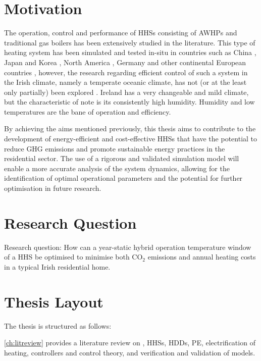 \section{Motivation}
The operation, control and performance of \acp{HHS} consisting of \acp{AWHP} and traditional gas boilers has been extensively studied in the literature. This type of heating system has been simulated and tested in-situ in countries such as China \cite{li_parallel_2018}, Japan and Korea \cite{jang_continuous_2013, park_performance_2014}, North America \cite{rauschkolb_cost-optimal_2020, }, Germany \cite{klein_numerical_2014} and other continental European countries \cite{bagarella_annual_2016, roccatello_analysis_2022, amirkhizi_cost_2020, dongellini_influence_2021,di_perna_experimental_2015}, however, the research regarding efficient control of such a system in the Irish climate, namely a temperate oceanic climate, has not (or at the least only partially) been explored \cite{heinen_electricity_2016}. Ireland has a very changeable and mild climate, but the characteristic of note is its consistently high humidity. Humidity and low temperatures are the bane of \HP operation and efficiency.

By achieving the aims mentioned previously, this thesis aims to contribute to the development of energy-efficient and cost-effective \acp{HHS} that have the potential to reduce \ac{GHG} emissions and promote sustainable energy practices in the residential sector. The use of a rigorous and validated simulation model will enable a more accurate analysis of the system dynamics, allowing for the identification of optimal operational parameters and the potential for further optimisation in future research.

\section{Research Question} 
Research question: How can a year-static hybrid operation temperature window of a \ac{HHS} be optimised to minimise both $\text{CO}_2$ emissions and annual heating costs in a typical Irish residential home.

\section{Thesis Layout}
The thesis is structured as follows: 

\cref{ch:litreview} provides a literature review on \HPs,  \acp{HHS}, \acp{HDD}, \ac{PE}, electrification of heating, controllers and control theory, and verification and validation of models.

